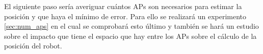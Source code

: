 El siguiente paso sería averiguar cuántos APs son necesarios para estimar la posición y que haya el mínimo de error. Para ello se realizará un experimento \ref{sec:num_aps} en el cual se comprobará esto último y también se hará un estudio sobre el impacto que tiene el espacio que hay entre los APs sobre el cálculo de la posición del robot.




